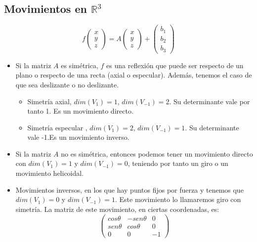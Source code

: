 \documentclass[11pt, a4paper]{article}
\newif\IfInSansMode
\newcommand{\R}{\mathbb{R}}
\theoremstyle{theorem-style}
\theoremstyle{definition-style}
\theoremstyle{remark-style}
\theoremstyle{example-style}
\begin{document}


\subsection{Movimientos en $\R^3$}

\[
  f \begin{pmatrix}
    x\\
    y\\
    z
  \end{pmatrix} = A\begin{pmatrix}
    x\\
    y\\
    z
  \end{pmatrix} + \begin{pmatrix}
    b_1\\
    b_2\\
    b_3
  \end{pmatrix}
\]

\begin{itemize}
\item Si la matriz $A$ es simétrica, $f$ es una reflexión que puede ser respecto de un plano o respecto de una recta (axial o especular). Además, tenemos el caso de que sea deslizante o no deslizante.

  \begin{itemize}
  \item Simetría axial, $dim(V_1) = 1$, $dim(V_{-1}) =2$. Su determinante vale por tanto 1. Es un movimiento directo.
  \item Simetría especular , $dim(V_1) = 2$, $dim(V_{-1}) =1$. Su determinante vale -1.Es un movimiento inverso.
  \end{itemize}

\item Si la matriz $A$ no es simétrica, entonces podemos tener un movimiento directo con $dim(V_1) = 1$ y $dim(V_{-1})=0$, teniendo por tanto un giro o un movimiento helicoidal.
  
\item Movimientos inversos, en los que hay puntos fijos por fuerza y tenemos que $dim(V_1) = 0$ y $dim(V_{-1}) = 1$. Este movimiento lo llamaremos giro con simetría. La matriz de este movimiento, en ciertas coordenadas, es:
  \[
    \begin{pmatrix}
      cos \theta & -sen\theta  & 0\\
      sen\theta & cos\theta  & 0\\
      0 & 0 & -1
    \end{pmatrix} 
  \]
\end{itemize}
\end{document}
